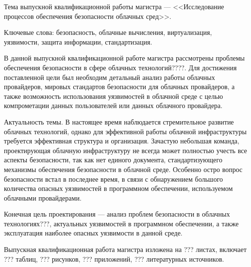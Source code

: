 
Тема выпускной квалификационной работы магистра --- <<Исследование процессов обеспечения безопасности облачных сред>>.

Ключевые слова: безопасность, облачные вычисления, виртуализация, уязвимости, защита информации, стандартизация.

В данной выпускной квалификационной работе магистра рассмотрены проблемы обеспечения безопасности в сфере облачных технологий????.
Для достижения поставленной цели был необходим детальный анализ работы облачных провайдеров, мировых стандартов безопасности для облачных провайдеров, а также возможность использования уязвимостей в облачной среде с целью компрометации данных пользователей или данных облачного провайдера.

Актуальность темы.
В настоящее время наблюдается стремительное развитие облачных технологий, однако для эффективной работы облачной инфраструктуры требуется эффективная структура и организация.
Зачастую небольшая команда, проектирующая облачную инфраструктуру не всегда может полностью учесть все аспекты безопасности, так как нет единого документа, стандартизующего механизмы обеспечения безопасности в облачной среде.
Особенно остро вопрос безопасности встал в последнее время, в связи с обнаружением большого количества опасных уязвимостей в программном обеспечении, используемом облачными провайдерами.

Конечная цель проектирования --- анализ проблем безопасности в облачных технологиях???, актуальных уязвимостей в программном обеспечении, а также эксплуатация наиболее опасных уязвимости в данной среде.

Выпускная квалификационная работа магистра изложена на ??? листах, включает ??? таблиц, ??? рисунков, ??? приложений, ??? литературных источников.

\clearpage
